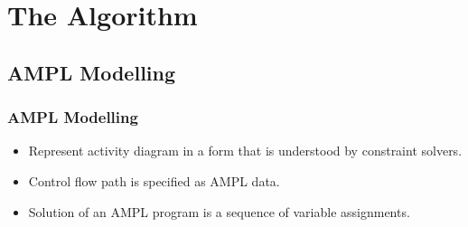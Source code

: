 \documentclass{beamer}
\begin{document}
\section{The Algorithm}

\subsection{AMPL Modelling}
\begin{frame}
\frametitle{AMPL Modelling \cite{AMPL}}
\begin{itemize}
  \item Represent activity diagram in a form that is understood by constraint solvers.
  \item Control flow path is specified as AMPL data.
  \item Solution of an AMPL program is a sequence of variable assignments.
\end{itemize}
\end{frame}
\end{document}
